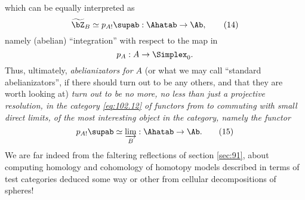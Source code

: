 which can be equally interpreted as
\begin{equation}
  \label{eq:102.14}
  \widetilde \bZ_B \simeq p_{A!}\supab : \Ahatab \to \Ab,\tag{14}
\end{equation}
namely (abelian) ``integration'' with respect to the map in \Cat
\[p_A:A\to\Simplex_0.\]
Thus, ultimately, \emph{abelianizators for $A$} (or what we may call
``standard abelianizators'', if there should turn out to be any
others, and that they are worth looking at) \emph{turn out to be no
  more, no less than just a projective resolution, in the category
  \eqref{eq:102.12} of functors from \Ahatab{} to \Ab{} commuting with
  small direct limits, of the most interesting object in the category,
  namely the functor}
\begin{equation}
  \label{eq:102.15}
  p_{A!}\supab \simeq \varinjlim_B : \Ahatab\to\Ab.\tag{15}
\end{equation}
We are far indeed from the faltering reflections of section
\ref{sec:91}, about computing homology and cohomology of homotopy
models described in terms of test categories deduced some way or other
from cellular decompositions of spheres!

\bigbreak

\presectionfill{}\par

